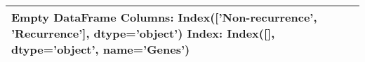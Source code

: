 \begin{tabular}{lcc}
\toprule
Empty DataFrame
Columns: Index(['Non-recurrence', 'Recurrence'], dtype='object')
Index: Index([], dtype='object', name='Genes') \\
\bottomrule
\end{tabular}
